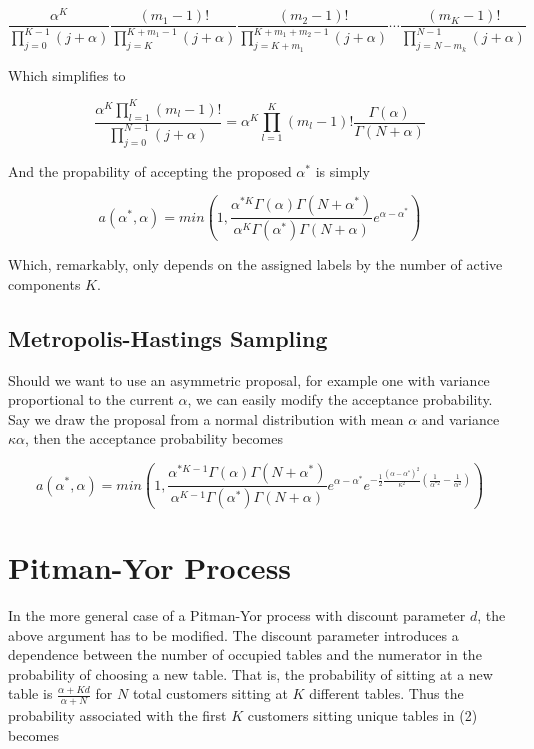\documentclass[11pt]{article}
\begin{document}
\begin{equation}
\frac{\alpha^K}{\prod_{j=0}^{K-1} (j + \alpha)} \frac{(m_1-1)!}{\prod_{j=K}^{K+m_1-1}(j + \alpha)} \frac{(m_2-1)!}{\prod_{j=K+m_1}^{K+m_1+m_2-1}(j + \alpha)} \cdots \frac{(m_K-1)!}{\prod_{j=N-m_k}^{N-1}(j + \alpha)}
\end{equation}

Which simplifies to

\begin{equation}
\frac{\alpha^K \prod_{l=1}^{K} (m_l - 1)!}{\prod_{j=0}^{N-1}(j+\alpha)} = 
\alpha^K\prod_{l=1}^{K} (m_l-1)! \frac{\Gamma(\alpha)}{\Gamma(N+\alpha)}
\end{equation}

And the propability of accepting the proposed $\alpha^*$ is simply

\begin{equation}
a(\alpha^*,\alpha) = min\left(1,\frac{\alpha^{*K}\Gamma(\alpha)\Gamma(N+\alpha^*)}{\alpha^{K}\Gamma(\alpha^*)\Gamma(N+\alpha)}  e^{\alpha-\alpha^*}\right)
\end{equation}

Which, remarkably, only depends on the assigned labels by the number of active components $K$.

\subsection{Metropolis-Hastings Sampling}

Should we want to use an asymmetric proposal, for example one with variance proportional to the current $\alpha$, we can easily modify the acceptance probability.  Say we draw the proposal from a normal distribution with mean $\alpha$ and variance $\kappa \alpha$, then the acceptance probability becomes

\begin{equation}
a(\alpha^*,\alpha) = min\left(1,\frac{\alpha^{*K-1}\Gamma(\alpha)\Gamma(N+\alpha^*)}{\alpha^{K-1}\Gamma(\alpha^*)\Gamma(N+\alpha)}  e^{\alpha-\alpha^*} e^{-\frac{1}{2}\frac{(\alpha-\alpha^*)^2}{\kappa^2} \left(\frac{1}{\alpha^{*2}} - \frac{1}{\alpha^2} \right)} \right)
\end{equation}

\section{Pitman-Yor Process}

In the more general case of a Pitman-Yor process with discount parameter $d$, the above argument has to be modified.  The discount parameter introduces a dependence between the number of occupied tables and the numerator in the probability of choosing a new table.  That is, the probability of sitting at a new table is $\frac{\alpha + Kd}{\alpha + N}$ for $N$ total customers sitting at $K$ different tables.  Thus the probability associated with the first $K$ customers sitting unique tables in (2) becomes
\end{document}
